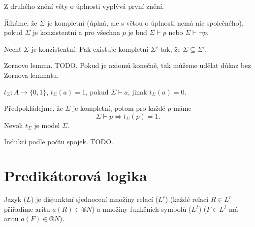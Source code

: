 \documentclass[12pt]{article}                   %
\begin{document}
    \begin{dusledek}
        Z druhého znění věty o úplnosti vyplývá první znění.
    \end{dusledek}

    \begin{definice}
        Říkáme, že $\Sigma$ je kompletní (úplná, ale s větou o úplnosti nemá nic společného), pokud $\Sigma$ je konzistentní a pro všechna $p$ je buď $\Sigma \vdash p$ nebo $\Sigma \vdash \neg p$.
    \end{definice}

    \begin{lemma}[Lindenbaum]
        Nechť $\Sigma$ je konzistentní. Pak existuje kompletní $\Sigma'$ tak, že $\Sigma \subseteq \Sigma'$.

        \begin{dukazin}
            Zornovo lemma. TODO. Pokud je axiomů konečně, tak můžeme udělat důkaz bez Zornova lemmatu.
        \end{dukazin}
    \end{lemma}

    \begin{definice}
        $t_\Sigma: A \rightarrow \{0, 1\}$, $t_\Sigma(a) = 1$, pokud $\Sigma \vdash a$, jinak $t_\Sigma(a)= 0$.
    \end{definice}

    \begin{lemma}
        Předpokládejme, že $\Sigma$ je kompletní, potom pro každé $p$ máme
        $$ \Sigma \vdash p \Leftrightarrow t_\Sigma(p) = 1. $$
        Nevoli $t_\Sigma$ je model $\Sigma$.

        \begin{dukazin}
            Indukcí podle počtu spojek. TODO.
        \end{dukazin}
    \end{lemma}


\section{Predikátorová logika}
    \begin{definice}[Jazyk]
        Jazyk ($L$) je disjunktní sjednocení množiny relací ($L^r$) (každé relaci $R \in L^r$ přiřadíme aritu $a(R) \in ®N$) a množiny funkčních symbolů ($L^f$) ($F \in L^f$ má aritu $a(F) \in ®N$).
    \end{definice}
\end{document}
